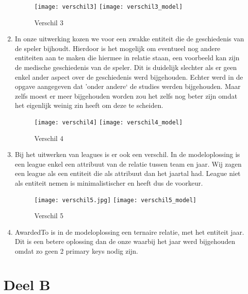 \documentclass[a4paper,kulak]{kulakarticle}
\begin{document}
\begin{enumerate}
		\begin{figure}[!htb]
			\centering
			\texttt{[image: verschil3]}
			\texttt{[image: verschil3\_model]}
			\caption{Verschil 3}
			\label{fig:verschil3}
		\end{figure}
	\item In onze uitwerking kozen we voor een zwakke entiteit die de geschiedenis van de speler bijhoudt. Hierdoor is het mogelijk om eventueel nog andere entiteiten aan te maken die hiermee in relatie staan, een voorbeeld kan zijn de medische geschiedenis van de speler. Dit is duidelijk slechter als er geen enkel ander aspect over de geschiedenis werd bijgehouden. Echter werd in de opgave aangegeven dat 'onder andere` de studies werden bijgehouden. Maar zelfs moest er meer bijgehouden worden zou het zelfs nog beter zijn omdat het eigenlijk weinig zin heeft om deze te scheiden. 
	
	
		\begin{figure}[!htb]
			\centering
			\texttt{[image: verschil4]}
			\texttt{[image: verschil4\_model]}
			\caption{Verschil 4}
			\label{fig:verschil4}
		\end{figure}
	\item Bij het uitwerken van leagues is er ook een verschil. In de modeloplossing is een league enkel een attribuut van de relatie tussen team en jaar. Wij zagen een league als een entiteit die als attribuut dan het jaartal had. 
	League niet als entiteit nemen is minimalistischer en heeft dus de voorkeur.

\begin{figure}[!htb]
	\centering
	\texttt{[image: verschil5.jpg]}
	\texttt{[image: verschil5\_model]}
	\caption{Verschil 5}
	\label{fig:verschil5}
\end{figure}

	\item AwardedTo is in de modeloplossing een ternaire relatie, met het entiteit jaar. Dit is een betere oplossing dan de onze waarbij het jaar werd bijgehouden omdat zo geen 2 primary keys nodig zijn.
	
	
	
\end{enumerate}

\section{Deel B}
\end{document}
